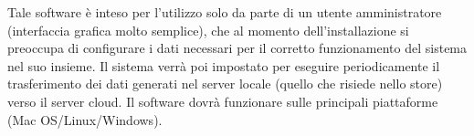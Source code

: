 Tale software è inteso per l'utilizzo solo da parte di un utente amministratore (interfaccia grafica molto semplice), che al momento dell'installazione si preoccupa di configurare i dati necessari per il corretto funzionamento del sistema nel suo insieme. Il sistema verrà poi impostato per eseguire periodicamente il trasferimento dei dati generati nel server locale (quello che risiede nello store) verso il server cloud.
Il software dovrà funzionare sulle principali piattaforme (Mac OS/Linux/Windows).















